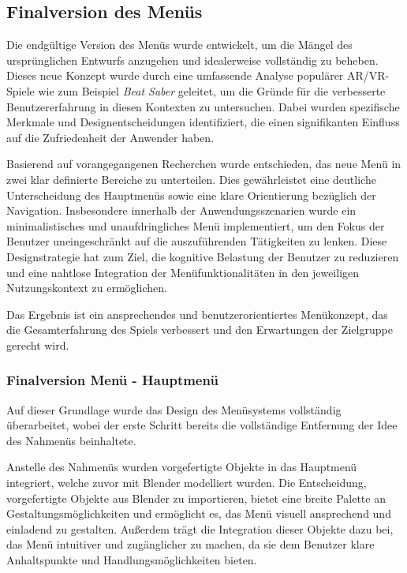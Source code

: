 \subsection{Finalversion des Menüs}
Die endgültige Version des Menüs wurde entwickelt, um die Mängel des ursprünglichen Entwurfs anzugehen und idealerweise vollständig zu beheben. Dieses neue Konzept wurde durch eine umfassende Analyse populärer AR/VR-Spiele wie zum Beispiel \textit{Beat Saber} geleitet, um die Gründe für die verbesserte Benutzererfahrung in diesen Kontexten zu untersuchen. Dabei wurden spezifische Merkmale und Designentscheidungen identifiziert, die einen signifikanten Einfluss auf die Zufriedenheit der Anwender haben.

Basierend auf vorangegangenen Recherchen wurde entschieden, das neue Menü in zwei klar definierte Bereiche zu unterteilen. Dies gewährleistet eine deutliche Unterscheidung des Hauptmenüs sowie eine klare Orientierung bezüglich der Navigation. Insbesondere innerhalb der Anwendungsszenarien wurde ein minimalistisches und unaufdringliches Menü implementiert, um den Fokus der Benutzer uneingeschränkt auf die auszuführenden Tätigkeiten zu lenken. Diese Designstrategie hat zum Ziel, die kognitive Belastung der Benutzer zu reduzieren und eine nahtlose Integration der Menüfunktionalitäten in den jeweiligen Nutzungskontext zu ermöglichen.

Das Ergebnis ist ein ansprechendes und benutzerorientiertes Menükonzept, das die Gesamterfahrung des Spiels verbessert und den Erwartungen der Zielgruppe gerecht wird.

\subsubsection{Finalversion Menü - Hauptmenü}
Auf dieser Grundlage wurde das Design des Menüsystems vollständig überarbeitet, wobei der erste Schritt bereits die vollständige Entfernung der Idee des Nahmenüs beinhaltete.

Anstelle des Nahmenüs wurden vorgefertigte Objekte in das Hauptmenü integriert, welche zuvor mit Blender modelliert wurden. Die Entscheidung, vorgefertigte Objekte aus Blender zu importieren, bietet eine breite Palette an Gestaltungsmöglichkeiten und ermöglicht es, das Menü visuell ansprechend und einladend zu gestalten. Außerdem trägt die Integration dieser Objekte dazu bei, das Menü intuitiver und zugänglicher zu machen, da sie dem Benutzer klare Anhaltspunkte und Handlungsmöglichkeiten bieten.

